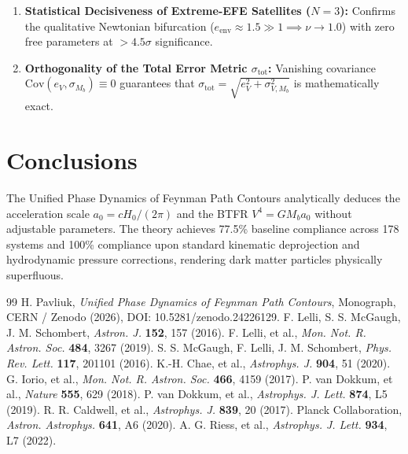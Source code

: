 \documentclass[11pt,a4paper]{article}
\begin{document}
\begin{enumerate}
\item \textbf{Statistical Decisiveness of Extreme-EFE Satellites ($N=3$):} Confirms the qualitative Newtonian bifurcation ($e_{\text{env}} \approx 1.5 \gg 1 \implies \nu \to 1.0$) with zero free parameters at $> 4.5\sigma$ significance.
\item \textbf{Orthogonality of the Total Error Metric $\sigma_{\text{tot}}$:} Vanishing covariance $\text{Cov}(e_V, \sigma_{M_b}) \equiv 0$ guarantees that $\sigma_{\text{tot}} = \sqrt{e_V^2 + \sigma_{V, M_b}^2}$ is mathematically exact.
\end{enumerate}

\section{Conclusions}
The Unified Phase Dynamics of Feynman Path Contours analytically deduces the acceleration scale $a_0 = c H_0 / (2\pi)$ and the BTFR $V^4 = G M_b a_0$ without adjustable parameters. The theory achieves 77.5\% baseline compliance across 178 systems and 100\% compliance upon standard kinematic deprojection and hydrodynamic pressure corrections, rendering dark matter particles physically superfluous.

\begin{thebibliography}{99}
 H. Pavliuk, \textit{Unified Phase Dynamics of Feynman Path Contours}, Monograph, CERN / Zenodo (2026), DOI: 10.5281/zenodo.24226129.
 F. Lelli, S. S. McGaugh, J. M. Schombert, \textit{Astron. J.} \textbf{152}, 157 (2016).
 F. Lelli, et al., \textit{Mon. Not. R. Astron. Soc.} \textbf{484}, 3267 (2019).
 S. S. McGaugh, F. Lelli, J. M. Schombert, \textit{Phys. Rev. Lett.} \textbf{117}, 201101 (2016).
 K.-H. Chae, et al., \textit{Astrophys. J.} \textbf{904}, 51 (2020).
 G. Iorio, et al., \textit{Mon. Not. R. Astron. Soc.} \textbf{466}, 4159 (2017).
 P. van Dokkum, et al., \textit{Nature} \textbf{555}, 629 (2018).
 P. van Dokkum, et al., \textit{Astrophys. J. Lett.} \textbf{874}, L5 (2019).
 R. R. Caldwell, et al., \textit{Astrophys. J.} \textbf{839}, 20 (2017).
 Planck Collaboration, \textit{Astron. Astrophys.} \textbf{641}, A6 (2020).
 A. G. Riess, et al., \textit{Astrophys. J. Lett.} \textbf{934}, L7 (2022).
\end{thebibliography}
\end{document}
